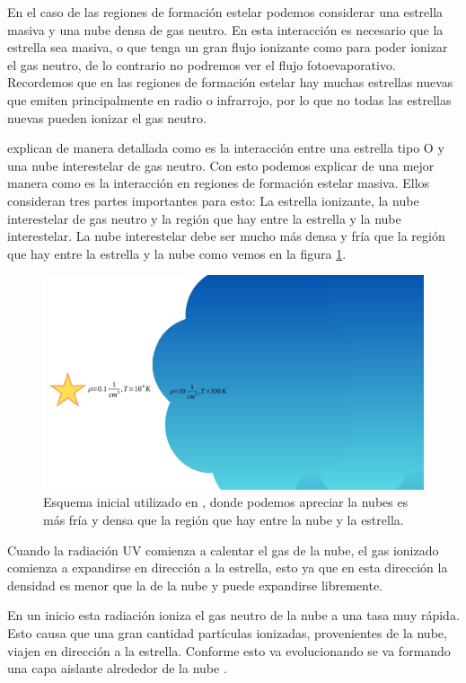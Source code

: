 \documentclass{book}
\begin{document}
En el caso de las regiones de formación estelar podemos considerar una estrella masiva y una nube densa de gas neutro. En esta interacción es necesario que la estrella sea masiva, o que tenga un gran flujo ionizante como para poder ionizar el gas neutro, de lo contrario no podremos ver el flujo fotoevaporativo. Recordemos que en las regiones de formación estelar hay muchas estrellas nuevas que emiten principalmente en radio o infrarrojo, por lo que no todas las estrellas nuevas pueden ionizar el gas neutro.

\cite{OortySpitzer_1955} explican de manera detallada como es la interacción entre una estrella tipo O y una nube interestelar de gas neutro. Con esto podemos explicar de una mejor manera como es la interacción en regiones de formación estelar masiva. Ellos consideran tres partes importantes para esto: La estrella ionizante, la nube interestelar de gas neutro y la región que hay entre la estrella y la nube interestelar. La nube interestelar debe ser mucho más densa y fría que la región que hay entre la estrella y la nube como vemos en la figura \ref{kahn_zones}.

\begin{figure}[htb]
    \centering
    \includegraphics[width= \textwidth]{artesanales/ImgFi01-5.pdf}
    \caption{Esquema inicial utilizado en \cite{OortySpitzer_1955}, donde podemos apreciar la nubes es más fría y densa que la región que hay entre la nube y la estrella.}
    \label{kahn_zones}
\end{figure}

Cuando la radiación UV comienza a calentar el gas de la nube, el gas ionizado comienza a expandirse en dirección a la estrella, esto ya que en esta dirección la densidad es menor que la de la nube y puede expandirse libremente. 

En un inicio esta radiación ioniza el gas neutro de la nube a una tasa muy rápida. Esto causa que una gran cantidad partículas ionizadas, provenientes de la nube, viajen en dirección a la estrella. Conforme esto va evolucionando se va formando una capa aislante alrededor de la nube \citep{OortySpitzer_1955}.
\end{document}
